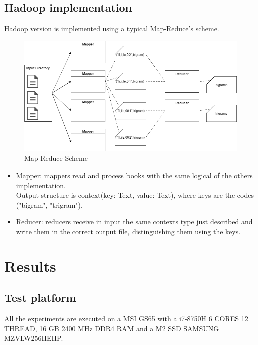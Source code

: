 \documentclass[10pt,twocolumn,letterpaper]{article}
\begin{document}
\subsection{Hadoop implementation}

Hadoop version is implemented using a typical Map-Reduce's scheme.\\


\begin{figure}[H]
\begin{center}
\includegraphics[width=\columnwidth]{template/latex/hadoop1.png}
\caption{Map-Reduce Scheme}
\label{fig:short}
\end{center}
\end{figure}
\vspace{2mm}
\begin{itemize}
    \item Mapper: mappers read and process books with the same logical of the others implementation.\\Output structure is context(key: Text, value: Text), where keys are the  codes ("bigram", "trigram").
    \item Reducer: reducers receive in input the same contexts type just described and write them in the correct output file, distinguishing them using the keys.
\end{itemize}

\section{Results}
\subsection{Test platform}

All the experiments are executed on a MSI GS65 with a i7-8750H 6 CORES 12 THREAD, 16 GB 2400 MHz DDR4 RAM and a M2 SSD SAMSUNG MZVLW256HEHP.
\end{document}

